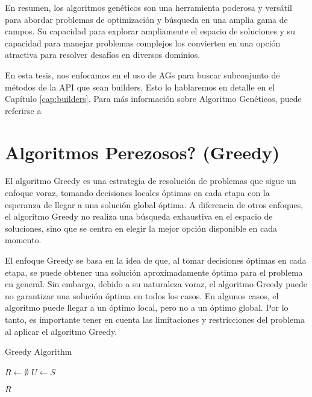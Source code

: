En resumen, los algoritmos genéticos son una herramienta poderosa y versátil para abordar problemas de optimización y búsqueda en una amplia gama de campos. Su capacidad para explorar ampliamente el espacio de soluciones y su capacidad para manejar problemas complejos los convierten en una opción atractiva para resolver desafíos en diversos dominios.

En esta tesis, nos enfocamos en el uso de AGs para buscar subconjunto de métodos de la API que sean builders. Esto lo hablaremos en detalle en el Capítulo \ref{cap:builders}. Para más información sobre Algoritmo Genéticos, puede referirse a \cite{dejong2006evolutionary} 


\section{Algoritmos Perezosos? (Greedy)}
\label{sec:greedyPrev}
El algoritmo Greedy es una estrategia de resolución de problemas que sigue un enfoque voraz, tomando decisiones locales óptimas en cada etapa con la esperanza de llegar a una solución global óptima. A diferencia de otros enfoques, el algoritmo Greedy no realiza una búsqueda exhaustiva en el espacio de soluciones, sino que se centra en elegir la mejor opción disponible en cada momento.

El enfoque Greedy se basa en la idea de que, al tomar decisiones óptimas en cada etapa, se puede obtener una solución aproximadamente óptima para el problema en general. Sin embargo, debido a su naturaleza voraz, el algoritmo Greedy puede no garantizar una solución óptima en todos los casos. En algunos casos, el algoritmo puede llegar a un óptimo local, pero no a un óptimo global. Por lo tanto, es importante tener en cuenta las limitaciones y restricciones del problema al aplicar el algoritmo Greedy.

\begin{algorithm}[H]
  \SetAlgoLined

  \caption{Greedy Algorithm}


  \BlankLine
  $R \gets \emptyset$ 
  $U \gets S$ 

  \BlankLine

  \BlankLine
  \Return $R$ 

\end{algorithm}

